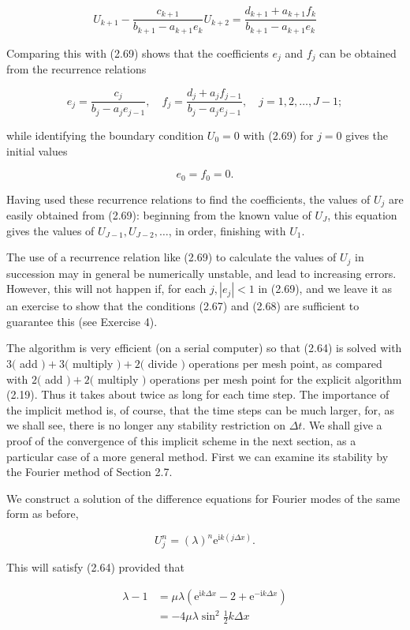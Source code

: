 \documentclass[10pt]{article}
\begin{document}
\[
U_{k+1}-\frac{c_{k+1}}{b_{k+1}-a_{k+1} e_{k}} U_{k+2}=\frac{d_{k+1}+a_{k+1} f_{k}}{b_{k+1}-a_{k+1} e_{k}}
\]

Comparing this with (2.69) shows that the coefficients \(e_{j}\) and \(f_{j}\) can be obtained from the recurrence relations

\[
e_{j}=\frac{c_{j}}{b_{j}-a_{j} e_{j-1}}, \quad f_{j}=\frac{d_{j}+a_{j} f_{j-1}}{b_{j}-a_{j} e_{j-1}}, \quad j=1,2, \ldots, J-1 ;
\]

while identifying the boundary condition \(U_{0}=0\) with (2.69) for \(j=0\) gives the initial values

\[
e_{0}=f_{0}=0 .
\]

Having used these recurrence relations to find the coefficients, the values of \(U_{j}\) are easily obtained from (2.69): beginning from the known value of \(U_{J}\), this equation gives the values of \(U_{J-1}, U_{J-2}, \ldots\), in order, finishing with \(U_{1}\).

The use of a recurrence relation like (2.69) to calculate the values of \(U_{j}\) in succession may in general be numerically unstable, and lead to increasing errors. However, this will not happen if, for each \(j,\left|e_{j}\right|<1\) in (2.69), and we leave it as an exercise to show that the conditions (2.67) and (2.68) are sufficient to guarantee this (see Exercise 4).

The algorithm is very efficient (on a serial computer) so that (2.64) is solved with \(3(\) add \()+3(\) multiply \()+2(\) divide \()\) operations per mesh point, as compared with \(2(\) add \()+2(\) multiply \()\) operations per mesh point for the explicit algorithm (2.19). Thus it takes about twice as long for each time step. The importance of the implicit method is, of course, that the time steps can be much larger, for, as we shall see, there is no longer any stability restriction on \(\Delta t\). We shall give a proof of the convergence of this implicit scheme in the next section, as a particular case of a more general method. First we can examine its stability by the Fourier method of Section 2.7.

We construct a solution of the difference equations for Fourier modes of the same form as before,

\[
U_{j}^{n}=(\lambda)^{n} \mathrm{e}^{\mathrm{i} k(j \Delta x)} .
\]

This will satisfy (2.64) provided that

\[
\begin{aligned}
\lambda-1 & =\mu \lambda\left(\mathrm{e}^{\mathrm{i} k \Delta x}-2+\mathrm{e}^{-\mathrm{i} k \Delta x}\right) \\
& =-4 \mu \lambda \sin ^{2} \frac{1}{2} k \Delta x
\end{aligned}
\]
\end{document}
